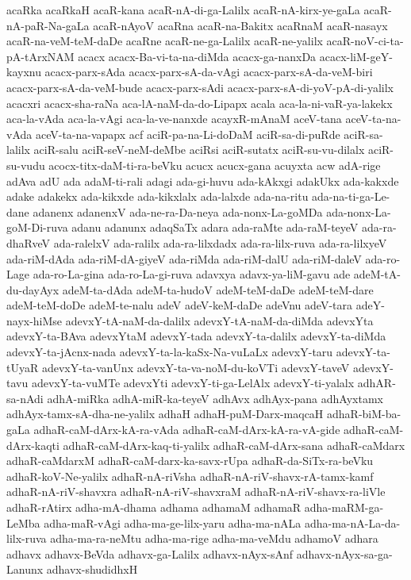 {acaRka
acaRkaH
acaR-kana
acaR-nA-di-ga-Lalilx
acaR-nA-kirx-ye-gaLa
acaR-nA-paR-Na-gaLa
acaR-nAyoV
acaRna
acaR-na-Bakitx
acaRnaM
acaR-nasayx
acaR-na-veM-teM-daDe
acaRne
acaR-ne-ga-Lalilx
acaR-ne-yalilx
acaR-noV-ci-ta-pA-tArxNAM
acacx
acacx-Ba-vi-ta-na-diMda
acacx-ga-nanxDa
acacx-liM-geY-kayxnu
acacx-parx-sAda
acacx-parx-sA-da-vAgi
acacx-parx-sA-da-veM-biri
acacx-parx-sA-da-veM-bude
acacx-parx-sAdi
acacx-parx-sA-di-yoV-pA-di-yalilx
acacxri
acacx-sha-raNa
aca-lA-naM-da-do-Lipapx
acala
aca-la-ni-vaR-ya-lakekx
aca-la-vAda
aca-la-vAgi
aca-la-ve-nanxde
acayxR-mAnaM
aceV-tana
aceV-ta-na-vAda
aceV-ta-na-vapapx
acf
aciR-pa-na-Li-doDaM
aciR-sa-di-puRde
aciR-sa-lalilx
aciR-salu
aciR-seV-neM-deMbe
aciRsi
aciR-sutatx
aciR-su-vu-dilalx
aciR-su-vudu
acocx-titx-daM-ti-ra-beVku
acucx
acucx-gana
acuyxta
acw
adA-rige
adAva
adU
ada
adaM-ti-rali
adagi
ada-gi-huvu
ada-kAkxgi
adakUkx
ada-kakxde
adake
adakekx
ada-kikxde
ada-kikxlalx
ada-lalxde
ada-na-ritu
ada-na-ti-ga-Le-dane
adanenx
adanenxV
ada-ne-ra-Da-neya
ada-nonx-La-goMDa
ada-nonx-La-goM-Di-ruva
adanu
adanunx
adaqSaTx
adara
ada-raMte
ada-raM-teyeV
ada-ra-dhaRveV
ada-ralelxV
ada-ralilx
ada-ra-lilxdadx
ada-ra-lilx-ruva
ada-ra-lilxyeV
ada-riM-dAda
ada-riM-dA-giyeV
ada-riMda
ada-riM-dalU
ada-riM-daleV
ada-ro-Lage
ada-ro-La-gina
ada-ro-La-gi-ruva
adavxya
adavx-ya-liM-gavu
ade
adeM-tA-du-dayAyx
adeM-ta-dAda
adeM-ta-hudoV
adeM-teM-daDe
adeM-teM-dare
adeM-teM-doDe
adeM-te-nalu
adeV
adeV-keM-daDe
adeVnu
adeV-tara
adeY-nayx-hiMse
adevxY-tA-naM-da-dalilx
adevxY-tA-naM-da-diMda
adevxYta
adevxY-ta-BAva
adevxYtaM
adevxY-tada
adevxY-ta-dalilx
adevxY-ta-diMda
adevxY-ta-jAcnx-nada
adevxY-ta-la-kaSx-Na-vuLaLx
adevxY-taru
adevxY-ta-tUyaR
adevxY-ta-vanUnx
adevxY-ta-va-noM-du-koVTi
adevxY-taveV
adevxY-tavu
adevxY-ta-vuMTe
adevxYti
adevxY-ti-ga-LelAlx
adevxY-ti-yalalx
adhAR-sa-nAdi
adhA-miRka
adhA-miR-ka-teyeV
adhAvx
adhAyx-pana
adhAyxtamx
adhAyx-tamx-sA-dha-ne-yalilx
adhaH
adhaH-puM-Darx-maqcaH
adhaR-biM-ba-gaLa
adhaR-caM-dArx-kA-ra-vAda
adhaR-caM-dArx-kA-ra-vA-gide
adhaR-caM-dArx-kaqti
adhaR-caM-dArx-kaq-ti-yalilx
adhaR-caM-dArx-sana
adhaR-caMdarx
adhaR-caMdarxM
adhaR-caM-darx-ka-savx-rUpa
adhaR-da-SiTx-ra-beVku
adhaR-koV-Ne-yalilx
adhaR-nA-riVsha
adhaR-nA-riV-shavx-rA-tamx-kamf
adhaR-nA-riV-shavxra
adhaR-nA-riV-shavxraM
adhaR-nA-riV-shavx-ra-liVle
adhaR-rAtirx
adha-mA-dhama
adhama
adhamaM
adhamaR
adha-maRM-ga-LeMba
adha-maR-vAgi
adha-ma-ge-lilx-yaru
adha-ma-nALa
adha-ma-nA-La-da-lilx-ruva
adha-ma-ra-neMtu
adha-ma-rige
adha-ma-veMdu
adhamoV
adhara
adhavx
adhavx-BeVda
adhavx-ga-Lalilx
adhavx-nAyx-sAnf
adhavx-nAyx-sa-ga-Lanunx
adhavx-shudidhxH
}
